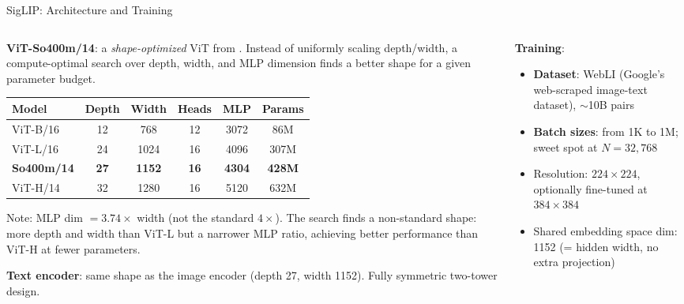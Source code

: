 \begin{frame}{SigLIP: Architecture and Training}

  \begin{columns}
    \begin{column}{0.55\textwidth}
      \textbf{ViT-So400m/14}: a \emph{shape-optimized} ViT from \cite{dehghani2023shape}.
      Instead of uniformly scaling depth/width, a compute-optimal search over depth, width, and MLP dimension finds a better shape for a given parameter budget.

      \vspace{0.3em}
      \begin{center}
      \scriptsize
      \begin{tabular}{l c c c c c}
        \toprule
        \textbf{Model} & \textbf{Depth} & \textbf{Width} & \textbf{Heads} & \textbf{MLP} & \textbf{Params} \\
        \midrule
        ViT-B/16  & 12 & 768  & 12 & 3072 & 86M  \\
        ViT-L/16  & 24 & 1024 & 16 & 4096 & 307M \\
        \textbf{So400m/14} & \textbf{27} & \textbf{1152} & \textbf{16} & \textbf{4304} & \textbf{428M} \\
        ViT-H/14  & 32 & 1280 & 16 & 5120 & 632M \\
        \bottomrule
      \end{tabular}
      \end{center}
      \vspace{0.1em}

      Note: MLP dim $= 3.74 \times$ width (not the standard $4\times$). The search finds a non-standard shape: more depth and width than ViT-L but a narrower MLP ratio, achieving better performance than ViT-H at fewer parameters.

      \vspace{0.2em}
      \textbf{Text encoder}: same shape as the image encoder (depth 27, width 1152). Fully symmetric two-tower design.
    \end{column}
    \begin{column}{0.43\textwidth}
      \textbf{Training}:
      \begin{itemize}
        \item \textbf{Dataset}: WebLI (Google's web-scraped image-text dataset), $\sim$10B pairs
        \item \textbf{Batch sizes}: from 1K to 1M; sweet spot at $N = 32{,}768$
        \item Resolution: $224 \times 224$, optionally fine-tuned at $384 \times 384$
        \item Shared embedding space dim: 1152 (= hidden width, no extra projection)
      \end{itemize}
    \end{column}
  \end{columns}
\end{frame}

